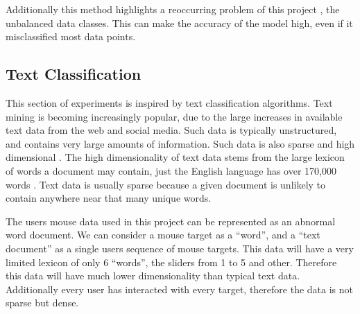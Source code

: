 \documentclass{article}
\begin{document}
Additionally this method highlights a reoccurring problem of this project
, the unbalanced data classes.
This can make the accuracy of the model high, even if it misclassified most data points.




\subsection{Text Classification}


This section of experiments is inspired by text classification algorithms.
Text mining is becoming increasingly popular, due to the large increases in available text data from the web and social media.
Such data is typically unstructured, and contains very large amounts of information.
Such data is also sparse and high dimensional \cite{aggarwal2012introduction}.
The high dimensionality of text data stems from the large lexicon of words a document may contain, just the English language has over 170,000 words \cite{BBC2018How}.
Text data is usually sparse because a given document is unlikely to contain anywhere near that many unique words.

The users mouse data used in this project can be represented as an abnormal word document.
We can consider a mouse target as a ``word'', and a ``text document'' as a single users sequence of mouse targets.
This data will have a very limited lexicon of only 6 ``words'', the sliders from 1 to 5 and other.
Therefore this data will have much lower dimensionality than typical text data.
Additionally every user has interacted with every target, therefore the data is not sparse but dense.

\end{document}
